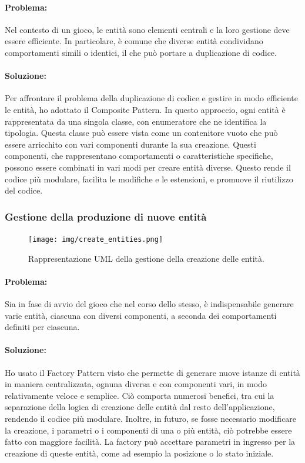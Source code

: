 \documentclass[a4paper,12pt]{report}
\begin{document}
\paragraph{Problema:}
Nel contesto di un gioco, le entità sono elementi centrali e la loro gestione deve essere efficiente. In particolare, è comune che diverse entità condividano comportamenti simili o identici, il che può portare a duplicazione di codice. 

\paragraph{Soluzione:}
Per affrontare il problema della duplicazione di codice e gestire in modo efficiente le entità, ho adottato il Composite Pattern. In questo approccio, ogni entità è rappresentata da una singola classe, con enumeratore che ne identifica la tipologia. Questa classe può essere vista come un contenitore vuoto che può essere arricchito con vari componenti durante la sua creazione. Questi componenti, che rappresentano comportamenti o caratteristiche specifiche, possono essere combinati in vari modi per creare entità diverse. Questo rende il codice più modulare, facilita le modifiche e le estensioni, e promuove il riutilizzo del codice. 

\subsubsection{Gestione della produzione di nuove entità}

\begin{figure}[H]
\centering{}
\texttt{[image: img/create\_entities.png]}
\caption{Rappresentazione UML della gestione della creazione delle entità.}
\end{figure}

\paragraph{Problema:}
Sia in fase di avvio del gioco che nel corso dello stesso, è indispensabile generare varie entità, ciascuna con diversi componenti, a seconda dei comportamenti definiti per ciascuna.

\paragraph{Soluzione:}
Ho usato il Factory Pattern visto che permette di generare nuove istanze di entità in maniera centralizzata, ognuna diversa e con componenti vari, in modo relativamente veloce e semplice. Ciò comporta numerosi benefici, tra cui la separazione della logica di creazione delle entità dal resto dell'applicazione, rendendo il codice più modulare. Inoltre, in futuro, se fosse necessario modificare la creazione, i parametri o i componenti di una o più entità, ciò potrebbe essere fatto con maggiore facilità. La factory può accettare parametri in ingresso per la creazione di queste entità, come ad esempio la posizione o lo stato iniziale.
\end{document}
